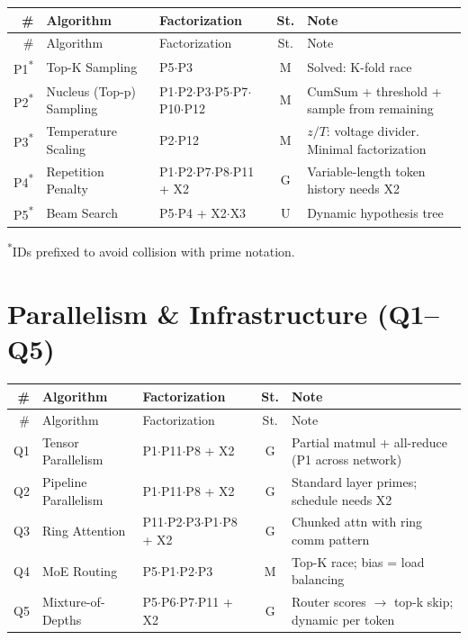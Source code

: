 \documentclass[10pt]{article}
\begin{document}
\begin{longtable}{rlp{3.0cm}cp{4.8cm}}
\toprule
\# & Algorithm & Factorization & St. & Note \\
\midrule
\endfirsthead
\toprule
\# & Algorithm & Factorization & St. & Note \\
\midrule
\endhead
\bottomrule
\endfoot
P1\textsuperscript{*} & Top-K Sampling & P5$\cdot$P3 & M & Solved: K-fold race \\
P2\textsuperscript{*} & Nucleus (Top-p) Sampling & P1$\cdot$P2$\cdot$P3$\cdot$P5$\cdot$P7$\cdot$P10$\cdot$P12 & M & CumSum + threshold + sample from remaining \\
P3\textsuperscript{*} & Temperature Scaling & P2$\cdot$P12 & M & $z/T$: voltage divider. Minimal factorization \\
P4\textsuperscript{*} & Repetition Penalty & P1$\cdot$P2$\cdot$P7$\cdot$P8$\cdot$P11 + X2 & G & Variable-length token history needs X2 \\
P5\textsuperscript{*} & Beam Search & P5$\cdot$P4 + X2$\cdot$X3 & U & Dynamic hypothesis tree \\
\end{longtable}
{\small\textsuperscript{*}IDs prefixed to avoid collision with prime notation.}

\section{Parallelism \& Infrastructure (Q1--Q5)}

\begin{longtable}{rlp{3.0cm}cp{4.8cm}}
\toprule
\# & Algorithm & Factorization & St. & Note \\
\midrule
\endfirsthead
\toprule
\# & Algorithm & Factorization & St. & Note \\
\midrule
\endhead
\bottomrule
\endfoot
Q1 & Tensor Parallelism & P1$\cdot$P11$\cdot$P8 + X2 & G & Partial matmul + all-reduce (P1 across network) \\
Q2 & Pipeline Parallelism & P1$\cdot$P11$\cdot$P8 + X2 & G & Standard layer primes; schedule needs X2 \\
Q3 & Ring Attention & P11$\cdot$P2$\cdot$P3$\cdot$P1$\cdot$P8 + X2 & G & Chunked attn with ring comm pattern \\
Q4 & MoE Routing & P5$\cdot$P1$\cdot$P2$\cdot$P3 & M & Top-K race; bias = load balancing \\
Q5 & Mixture-of-Depths & P5$\cdot$P6$\cdot$P7$\cdot$P11 + X2 & G & Router scores $\to$ top-k skip; dynamic per token \\
\end{longtable}
\end{document}
